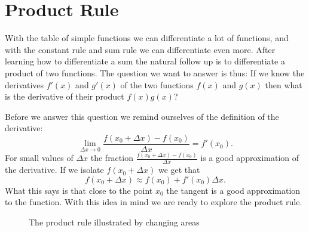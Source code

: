 \documentclass[main.tex]{subfiles}
\begin{document}
\section{Product Rule}
With the table of simple functions we can differentiate a lot of functions, and with the constant rule and sum rule we can differentiate even more. After learning how to differentiate a sum the natural follow up is to differentiate a product of two functions. The question we want to answer is thus: If we know the derivatives $f'(x)$ and $g'(x)$ of the two functions $f(x)$ and $g(x)$ then what is the derivative of their product $f(x) g(x)$?

Before we answer this question we remind ourselves of the definition of the derivative:
\begin{equation}
\lim_{\Delta x \to 0} \frac{f(x_0 + \Delta x) - f(x_0)}{\Delta x} = f'(x_0).
\end{equation}
For small values of $\Delta x$ the fraction $\frac{f(x_0 + \Delta x) - f(x_0)}{\Delta x}$ is a good approximation of the derivative. If we isolate $f(x_0 + \Delta x)$ we get that
\begin{equation}
f(x_0 + \Delta x) \approx f(x_0) + f'(x_0) \Delta x.
\end{equation}
What this says is that close to the point $x_0$ the tangent is a good approximation to the function. With this idea in mind we are ready to explore the product rule.

\begin{figure}
\begin{center}
\caption{The product rule illustrated by changing areas} \label{fig:prodRule}
\end{center}
\end{figure}
\end{document}
